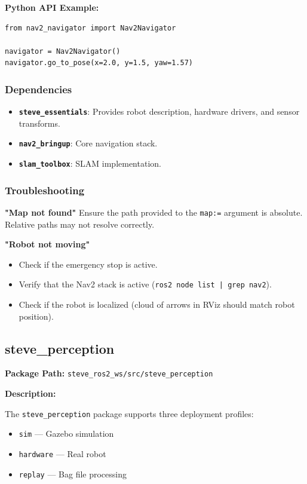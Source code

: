 \documentclass[12pt,oneside,a4paper]{article}
\begin{document}
\textbf{Python API Example:}
\begin{lstlisting}[style=pythonstyle]
from nav2_navigator import Nav2Navigator

navigator = Nav2Navigator()
navigator.go_to_pose(x=2.0, y=1.5, yaw=1.57)
\end{lstlisting}

\subsubsection{Dependencies}
\begin{itemize}
    \item \textbf{\texttt{steve\_essentials}}: Provides robot description, hardware drivers, and sensor transforms.
    \item \textbf{\texttt{nav2\_bringup}}: Core navigation stack.
    \item \textbf{\texttt{slam\_toolbox}}: SLAM implementation.
\end{itemize}

\subsubsection{Troubleshooting}

\textbf{"Map not found"}
Ensure the path provided to the \texttt{map:=} argument is absolute. Relative paths may not resolve correctly.

\textbf{"Robot not moving"}
\begin{itemize}
    \item Check if the emergency stop is active.
    \item Verify that the Nav2 stack is active (\texttt{ros2 node list | grep nav2}).
    \item Check if the robot is localized (cloud of arrows in RViz should match robot position).
\end{itemize}

\subsection{steve\_perception}
\label{subsec:steve_perception}

\textbf{Package Path:} \texttt{steve\_ros2\_ws/src/steve\_perception}

\textbf{Description:}

The \texttt{steve\_perception} package supports three deployment profiles:
\begin{itemize}
    \item \texttt{sim} — Gazebo simulation
    \item \texttt{hardware} — Real robot
    \item \texttt{replay} — Bag file processing
\end{itemize}
\end{document}
